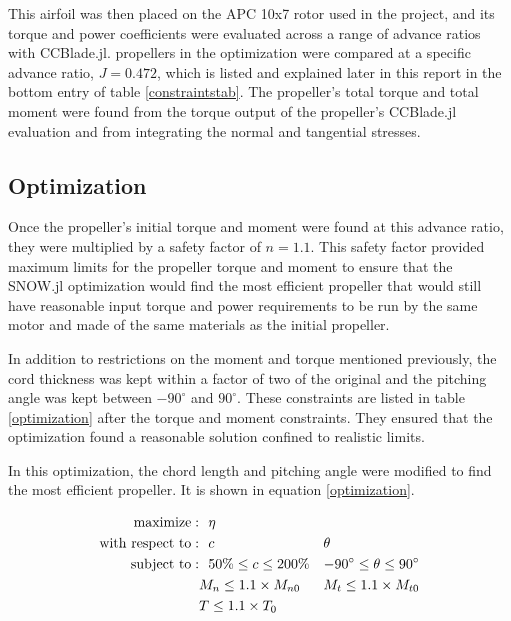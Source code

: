 \documentclass[journal ]{new-aiaa}
\begin{document}
This airfoil was then placed on the APC 10x7 rotor used in the project, and its torque and power coefficients were evaluated across a range of advance ratios with CCBlade.jl. propellers in the optimization were compared at a specific advance ratio, $J=0.472$, which is listed and explained later in this report in the bottom entry of table \ref{constraintstab}. The propeller's total torque and total moment were found from the torque output of the propeller's CCBlade.jl evaluation and from integrating the normal and tangential stresses.

\subsection{Optimization}

Once the propeller's initial torque and moment were found at this advance ratio, they were multiplied by a safety factor of $n=1.1$. This safety factor provided maximum limits for the propeller torque and moment to ensure that the SNOW.jl optimization would find the most efficient propeller that would still have reasonable input torque and power requirements to be run by the same motor and made of the same materials as the initial propeller.

In addition to restrictions on the moment and torque mentioned previously, the cord thickness was kept within a factor of two of the original and the pitching angle was kept between $-90^{\circ}$ and $90^{\circ}$. These constraints are listed in table \ref{optimization} after the torque and moment constraints. They ensured that the optimization found a reasonable solution confined to realistic limits.

In this optimization, the chord length and pitching angle were modified to find the most efficient propeller. It is shown in equation \ref{optimization}. 

\begin{equation}
	\label{optimization}
	\begin{aligned}
		\mathrm{maximize:}& ~~ \eta \\
		\mathrm{with~respect~to:}& ~~ c & \multicolumn{1}{l}{$\theta$} \\
		\mathrm{subject~to:}& ~~ 50\% \leq c \leq 200\% & -90^{\circ} \leq \theta \leq 90^{\circ} \\
		& M_{n} \leq 1.1 \times M_{n0} & M_{t} \leq 1.1 \times M_{t0} \\
		& T \leq 1.1 \times T_{0} \\
	\end{aligned}
\end{equation}
\end{document}
